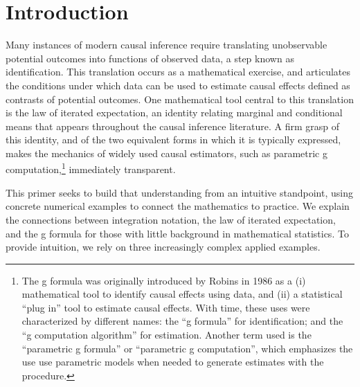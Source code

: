 \documentclass[12pt]{article}
\numberwithin{equation}{section}
\begin{document}
\par\medskip\noindent
%
%
%
%
%
%
%
%
%
%
%
%
%
%
%
%
%
%
%
%
%
%
%
%
%
\newpage
\doublespacing
\setcounter{page}{1}

\section{Introduction}

Many instances of modern causal inference require translating unobservable potential outcomes into functions of observed data, a step known as identification. This translation occurs as a mathematical exercise, and articulates the conditions under which data can be used to estimate causal effects defined as contrasts of potential outcomes. One mathematical tool central to this translation is the law of iterated expectation, an identity relating marginal and conditional means that appears throughout the causal inference literature. A firm grasp of this identity, and of the two equivalent forms in which it is typically expressed, makes the mechanics of widely used causal estimators, such as parametric g computation,\footnote{The g formula was originally introduced by Robins in 1986\cite{Robins1986} as a (i) mathematical tool to identify causal effects using data, and (ii) a statistical ``plug in'' tool to estimate causal effects. With time, these uses were characterized by different names: the ``g formula'' for identification; and the ``g computation algorithm'' for estimation. Another term used is the ``parametric g formula'' or ``parametric g computation'', which emphasizes the use use parametric models when needed to generate estimates with the procedure.} immediately transparent. 

This primer seeks to build that understanding from an intuitive standpoint, using concrete numerical examples to connect the mathematics to practice. We explain the connections between integration notation, the law of iterated expectation, and the g formula for those with little background in mathematical statistics. To provide intuition, we rely on three increasingly complex applied examples. %
\end{document}
